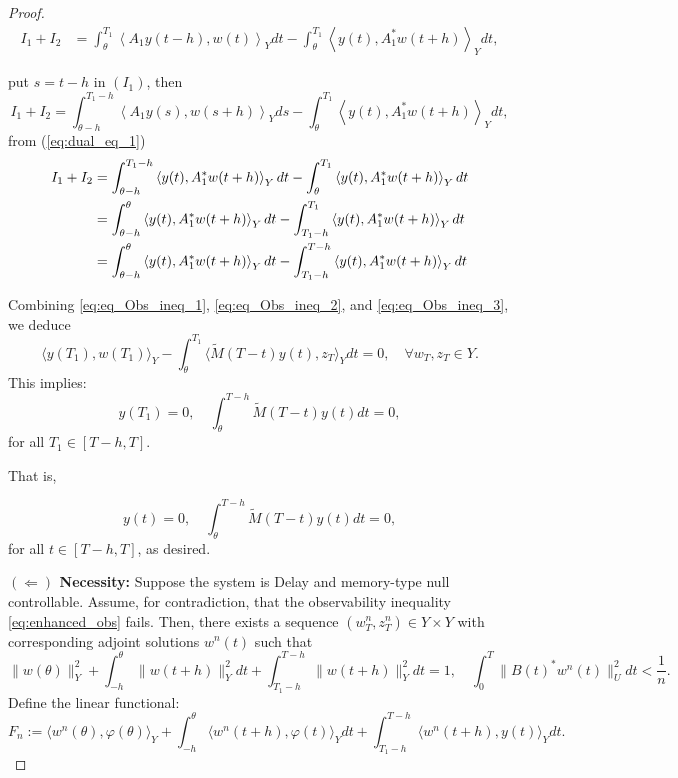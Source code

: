 \documentclass[12pt]{article}
\theoremstyle{plain}
\theoremstyle{definition}
\begin{document}
\begin{proof}
 \begin{align*}
     I_1+I_2&= \int_{\theta}^{T_1}\left\langle A_1 y(t-h),w(t)\right\rangle_Y dt -\int_{\theta}^{T_1}\left\langle y(t),A_1^*w(t+h)\right\rangle_Y dt,
 \end{align*}

put $s=t-h$ in $(I_1)$, then
$$I_1+I_2= \int_{\theta-h}^{T_1-h}\left\langle A_1 y(s),w(s+h)\right\rangle_Y ds -\int_{\theta}^{T_1}\left\langle y(t),A_1^*w(t+h)\right\rangle_Y dt,$$
from (\ref{eq:dual_eq_1})
\begin{align}\label{eq:eq_Obs_ineq_2}
    I_1+I_2&= \int_{\theta-h}^{T_1-h}\left\langle  y(t),A_1^*w(t+h)\right\rangle_Y dt -\int_{\theta}^{T_1}\left\langle y(t),A_1^*w(t+h)\right\rangle_Y dt \notag\\
    &=\int_{\theta-h}^{\theta}\left\langle  y(t),A_1^*w(t+h)\right\rangle_Y dt- \int_{T_1-h}^{T_1}\left\langle  y(t),A_1^*w(t+h)\right\rangle_Y dt \notag \\
    &=\int_{\theta-h}^{\theta}\left\langle  y(t),A_1^*w(t+h)\right\rangle_Y dt- \int_{T_1-h}^{T-h}\left\langle  y(t),A_1^*w(t+h)\right\rangle_Y dt
\end{align}

 Combining \eqref{eq:eq_Obs_ineq_1}, \eqref{eq:eq_Obs_ineq_2}, and \eqref{eq:eq_Obs_ineq_3}, we deduce
\[
\langle y(T_1), w(T_1) \rangle_Y - \int_{\theta}^{T_1} \langle \widetilde{M}(T - t)y(t), z_T \rangle_Y dt = 0, \quad \forall w_T, z_T \in Y.
\]
This implies:
\[
y(T_1) = 0, \quad \int_{\theta}^{T-h} \widetilde{M}(T - t)y(t) dt = 0,
\]
for all $T_1 \in [T-h, T]$.

That is,

\[
y(t) = 0, \quad \int_{\theta}^{T-h} \widetilde{M}(T - t)y(t) dt = 0,
\]
for all $t \in [T-h, T]$, as desired.

























\textbf{$(\Leftarrow)$ Necessity:} Suppose the system is Delay and memory-type null controllable. Assume, for contradiction, that the observability inequality \eqref{eq:enhanced_obs} fails. Then, there exists a sequence $(w_T^n, z_T^n) \in Y \times Y$ with corresponding adjoint solutions $w^n(t)$ such that
\[
\|w(\theta)\|_Y^2 + \int_{ - h}^{\theta} \|w(t+h)\|_Y^2 dt+ \int_{T_1 - h}^{T-h} \|w(t+h)\|_Y^2 dt = 1, \quad \int_0^T \|B(t)^* w^n(t)\|_U^2 dt < \frac{1}{n}.
\]
Define the linear functional:
\[
F_n := \langle w^n(\theta), \varphi(\theta) \rangle_Y + \int_{- h}^{\theta} \langle w^n(t+h), \varphi(t) \rangle_Y dt + \int_{T_1- h}^{T-h} \langle w^n(t+h), y(t) \rangle_Y dt.
\]


\end{proof}
\end{document}
